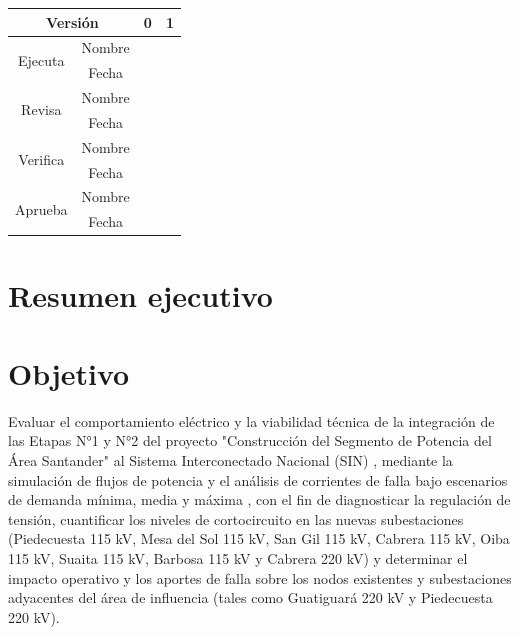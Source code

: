 \documentclass[12pt]{article}
\begin{document}
\begin{table}[h]
\centering
\begin{tabular}{|cc|c|c|}
\hline
\multicolumn{2}{|c|}{Versión}                            & 0 & 1 \\ \hline
\multicolumn{1}{|c|}{\multirow{2}{*}{Ejecuta}}  & Nombre &   &   \\ \cline{2-4} 
\multicolumn{1}{|c|}{}                          & Fecha  &   &   \\ \hline
\multicolumn{1}{|c|}{\multirow{2}{*}{Revisa}}   & Nombre &   &   \\ \cline{2-4} 
\multicolumn{1}{|c|}{}                          & Fecha  &   &   \\ \hline
\multicolumn{1}{|c|}{\multirow{2}{*}{Verifica}} & Nombre &   &   \\ \cline{2-4} 
\multicolumn{1}{|c|}{}                          & Fecha  &   &   \\ \hline
\multicolumn{1}{|c|}{\multirow{2}{*}{Aprueba}}  & Nombre &   &   \\ \cline{2-4} 
\multicolumn{1}{|c|}{}                          & Fecha  &   &   \\ \hline
\end{tabular}
\end{table}

\newpage
\vspace*{0.1cm}

\renewcommand\contentsname{Tabla de contenido}
\tableofcontents


\newpage
\vspace*{0.1cm}

\renewcommand{\listfigurename}{Lista de figuras}
\listoffigures


\newpage
\vspace*{0.1cm}

\renewcommand{\listtablename}{Lista de tablas}
\listoftables


\newpage
\vspace*{0.1cm}

\section{Resumen ejecutivo}

\section{Objetivo}
Evaluar el comportamiento eléctrico y la viabilidad técnica de la integración de las Etapas N°1 y N°2 del proyecto "Construcción del Segmento de Potencia del Área Santander" al Sistema Interconectado Nacional (SIN)
, mediante la simulación de flujos de potencia y el análisis de corrientes de falla bajo escenarios de demanda mínima, media y máxima
, con el fin de diagnosticar la regulación de tensión, cuantificar los niveles de cortocircuito en las nuevas subestaciones (Piedecuesta 115 kV, Mesa del Sol 115 kV, San Gil 115 kV, Cabrera 115 kV, Oiba 115 kV, Suaita 115 kV, Barbosa 115 kV y Cabrera 220 kV)
 y determinar el impacto operativo y los aportes de falla sobre los nodos existentes y subestaciones adyacentes del área de influencia (tales como Guatiguará 220 kV y Piedecuesta 220 kV).
\end{document}
